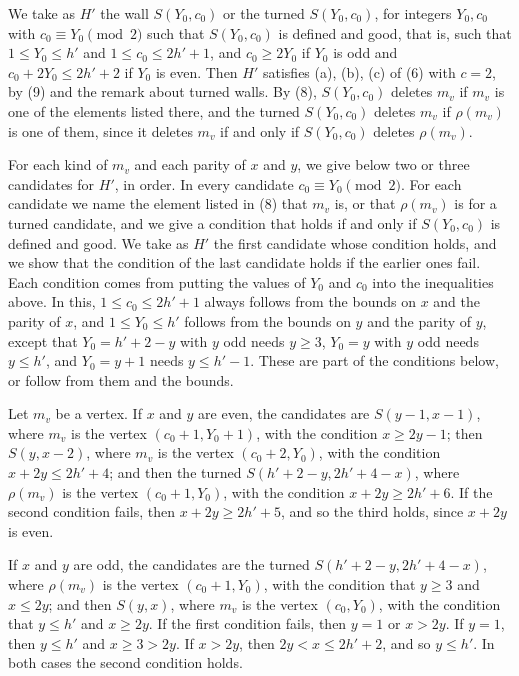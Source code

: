 {We take as $H'$ the wall $S(Y_0, c_0)$ or the turned $S(Y_0, c_0)$, for integers $Y_0, c_0$ with $c_0 \equiv Y_0 \pmod 2$ such that $S(Y_0, c_0)$ is defined and good, that is, such that $1 \le Y_0 \le h'$ and $1 \le c_0 \le 2h' + 1$, and $c_0 \ge 2Y_0$ if $Y_0$ is odd and $c_0 + 2Y_0 \le 2h' + 2$ if $Y_0$ is even. Then $H'$ satisfies (a), (b), (c) of (6) with $c = 2$, by (9) and the remark about turned walls. By (8), $S(Y_0, c_0)$ deletes $m_v$ if $m_v$ is one of the elements listed there, and the turned $S(Y_0, c_0)$ deletes $m_v$ if $\rho(m_v)$ is one of them, since it deletes $m_v$ if and only if $S(Y_0, c_0)$ deletes $\rho(m_v)$.

For each kind of $m_v$ and each parity of $x$ and $y$, we give below two or three candidates for $H'$, in order. In every candidate $c_0 \equiv Y_0 \pmod 2$. For each candidate we name the element listed in (8) that $m_v$ is, or that $\rho(m_v)$ is for a turned candidate, and we give a condition that holds if and only if $S(Y_0, c_0)$ is defined and good. We take as $H'$ the first candidate whose condition holds, and we show that the condition of the last candidate holds if the earlier ones fail. Each condition comes from putting the values of $Y_0$ and $c_0$ into the inequalities above. In this, $1 \le c_0 \le 2h' + 1$ always follows from the bounds on $x$ and the parity of $x$, and $1 \le Y_0 \le h'$ follows from the bounds on $y$ and the parity of $y$, except that $Y_0 = h' + 2 - y$ with $y$ odd needs $y \ge 3$, $Y_0 = y$ with $y$ odd needs $y \le h'$, and $Y_0 = y + 1$ needs $y \le h' - 1$. These are part of the conditions below, or follow from them and the bounds.

Let $m_v$ be a vertex. If $x$ and $y$ are even, the candidates are $S(y - 1, x - 1)$, where $m_v$ is the vertex $(c_0 + 1, Y_0 + 1)$, with the condition $x \ge 2y - 1$; then $S(y, x - 2)$, where $m_v$ is the vertex $(c_0 + 2, Y_0)$, with the condition $x + 2y \le 2h' + 4$; and then the turned $S(h' + 2 - y, 2h' + 4 - x)$, where $\rho(m_v)$ is the vertex $(c_0 + 1, Y_0)$, with the condition $x + 2y \ge 2h' + 6$. If the second condition fails, then $x + 2y \ge 2h' + 5$, and so the third holds, since $x + 2y$ is even.

If $x$ and $y$ are odd, the candidates are the turned $S(h' + 2 - y, 2h' + 4 - x)$, where $\rho(m_v)$ is the vertex $(c_0 + 1, Y_0)$, with the condition that $y \ge 3$ and $x \le 2y$; and then $S(y, x)$, where $m_v$ is the vertex $(c_0, Y_0)$, with the condition that $y \le h'$ and $x \ge 2y$. If the first condition fails, then $y = 1$ or $x > 2y$. If $y = 1$, then $y \le h'$ and $x \ge 3 > 2y$. If $x > 2y$, then $2y < x \le 2h' + 2$, and so $y \le h'$. In both cases the second condition holds.

}
